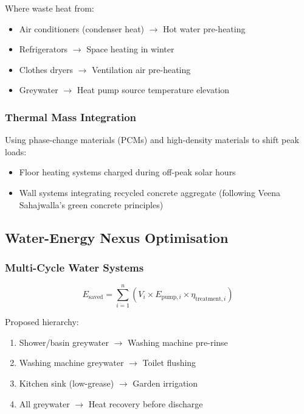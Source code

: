 \documentclass[12pt,a4paper]{article}
\begin{document}
Where waste heat from:
\begin{itemize}
    \item Air conditioners (condenser heat) $\rightarrow$ Hot water pre-heating
    \item Refrigerators $\rightarrow$ Space heating in winter
    \item Clothes dryers $\rightarrow$ Ventilation air pre-heating
    \item Greywater $\rightarrow$ Heat pump source temperature elevation
\end{itemize}

\subsubsection{Thermal Mass Integration}
Using phase-change materials (PCMs) and high-density materials to shift peak loads:
\begin{itemize}
    \item Floor heating systems charged during off-peak solar hours
    \item Wall systems integrating recycled concrete aggregate (following Veena Sahajwalla's green concrete principles)
\end{itemize}

\subsection{Water-Energy Nexus Optimisation}

\subsubsection{Multi-Cycle Water Systems}
\begin{equation}
    E_{\text{saved}} = \sum_{i=1}^{n} (V_i \times E_{\text{pump},i} \times \eta_{\text{treatment},i})
\end{equation}

Proposed hierarchy:
\begin{enumerate}
    \item Shower/basin greywater $\rightarrow$ Washing machine pre-rinse
    \item Washing machine greywater $\rightarrow$ Toilet flushing
    \item Kitchen sink (low-grease) $\rightarrow$ Garden irrigation
    \item All greywater $\rightarrow$ Heat recovery before discharge
\end{enumerate}
\end{document}
